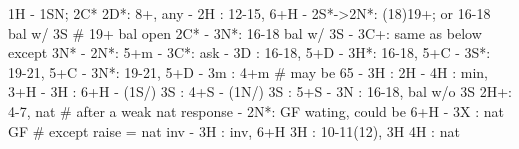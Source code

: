 1H - 1SN; 2C*
2D*: 8+, any
   - 2H : 12-15, 6+H
   - 2S*->2N*: (18)19+; or 16-18 bal w/ 3S  # 19+ bal open 2C*
             - 3N*: 16-18 bal w/ 3S
             - 3C+: same as below except 3N*
   - 2N*: 5+m
        - 3C*: ask
            - 3D : 16-18, 5+D
            - 3H*: 16-18, 5+C
            - 3S*: 19-21, 5+C
            - 3N*: 19-21, 5+D
   - 3m : 4+m  # may be 65
        - 3H : 2H
        - 4H : min, 3+H
   - 3H : 6+H
   - (1S/) 3S : 4+S
   - (1N/) 3S : 5+S
   - 3N : 16-18, bal w/o 3S
2H+: 4-7, nat
# after a weak nat response
   - 2N*: GF wating, could be 6+H
   - 3X : nat GF  # except raise = nat inv
   - 3H : inv, 6+H
3H : 10-11(12), 3H
4H : nat